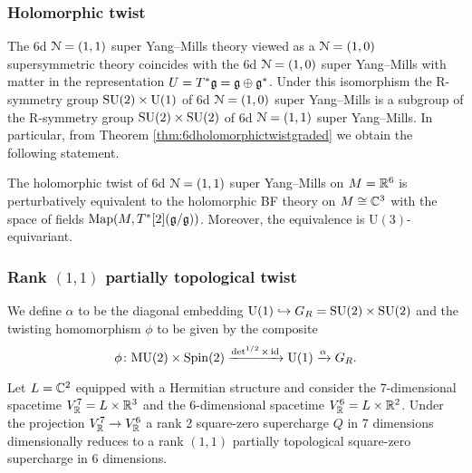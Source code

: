 \documentclass[10pt, oneside]{article}
\newcommand{\MU}{\mathrm{MU}}
\renewcommand{\U}{\mathrm{U}}
\begin{document}
\subsubsection{Holomorphic twist}

The 6d $\mathcal N=(1, 1)$ super Yang--Mills theory viewed as a $\mathcal N=(1, 0)$ supersymmetric theory coincides with the 6d $\mathcal N=(1, 0)$ super Yang--Mills with matter in the representation $U=T^*\mathfrak g=\mathfrak g\oplus \mathfrak g^*$. Under this isomorphism the R-symmetry group $\SU(2)\times \U(1)$ of 6d $\mathcal N=(1, 0)$ super Yang--Mills is a subgroup of the R-symmetry group $\mathrm{SU}(2)\times \mathrm{SU}(2)$ of 6d $\mathcal N=(1, 1)$ super Yang--Mills. In particular, from Theorem \ref{thm:6dholomorphictwistgraded} we obtain the following statement.

\begin{thm}
The holomorphic twist of 6d $\mathcal N=(1, 1)$ super Yang--Mills on $M=\mathbb R^6$ is perturbatively equivalent to the holomorphic BF theory on $M\cong \mathbb C^3$ with the space of fields $\operatorname{Map}(M, T^*[2] (\mathfrak g/\mathfrak g))$. Moreover, the equivalence is $\U(3)$-equivariant.
\label{thm:6d11holomorphictwist}
\end{thm}

\subsubsection{Rank $(1, 1)$ partially topological twist}

We define $\alpha$ to be the diagonal embedding $\U(1)\hookrightarrow G_R=\SU(2)\times \SU(2)$ and the twisting homomorphism $\phi$ to be given by the composite
\[\phi\colon \MU(2)\times \Spin(2)\xrightarrow{\det^{1/2}\times \id} \U(1)\xrightarrow{\alpha}G_R.\]

Let $L=\mathbb C^2$ equipped with a Hermitian structure and consider the 7-dimensional spacetime $V^7_\mathbb R = L\times \mathbb R^3$ and the 6-dimensional spacetime $V^6_\mathbb R=L\times \mathbb R^2$. Under the projection $V^7_\mathbb R\rightarrow V^6_\mathbb R$ a rank 2 square-zero supercharge $Q$ in 7 dimensions dimensionally reduces to a rank $(1, 1)$ partially topological square-zero supercharge in 6 dimensions.
\end{document}
